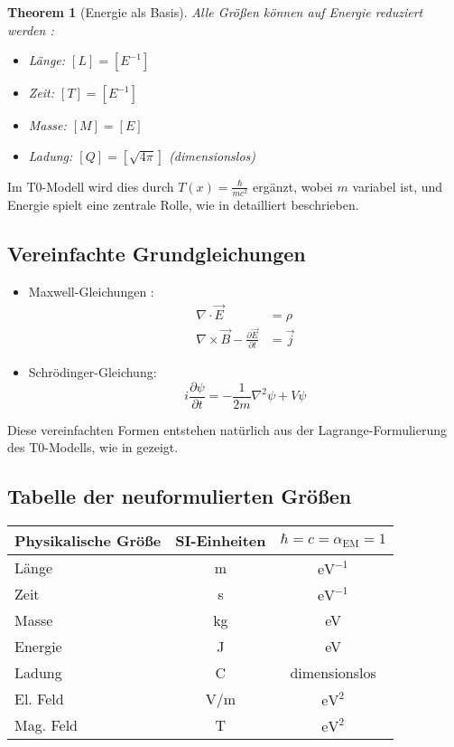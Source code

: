 \documentclass[12pt,a4paper]{article}
\newcommand{\Tfield}{T(x)}
\newcommand{\alphaEM}{\alpha_{\text{EM}}}
\newtheorem{theorem}{Theorem}[section]
\begin{document}
	\begin{theorem}[Energie als Basis]
		Alle Größen können auf Energie reduziert werden \cite{Duff2002}:
		\begin{itemize}
			\item Länge: \([L] = [E^{-1}]\)
			\item Zeit: \([T] = [E^{-1}]\)
			\item Masse: \([M] = [E]\)
			\item Ladung: \([Q] = [\sqrt{4\pi}]\) (dimensionslos)
		\end{itemize}
	\end{theorem}
	
	Im T0-Modell wird dies durch \(\Tfield = \frac{\hbar}{m c^2}\) ergänzt, wobei \(m\) variabel ist, und Energie spielt eine zentrale Rolle, wie in \cite{pascher_zeit_masse_2025} detailliert beschrieben.
	
	\subsection{Vereinfachte Grundgleichungen}
	\label{subsec:simplified_equations}
	
	\begin{itemize}
		\item Maxwell-Gleichungen \cite{Feynman1985}:
		\begin{align}
			\nabla \cdot \vec{E} &= \rho \\
			\nabla \times \vec{B} - \frac{\partial \vec{E}}{\partial t} &= \vec{j}
		\end{align}
		\item Schrödinger-Gleichung:
		\begin{equation}
			i \frac{\partial \psi}{\partial t} = -\frac{1}{2m} \nabla^2 \psi + V \psi
		\end{equation}
	\end{itemize}
	
	Diese vereinfachten Formen entstehen natürlich aus der Lagrange-Formulierung des T0-Modells, wie in \cite{pascher_lagrange_2025} gezeigt.
	
	\subsection{Tabelle der neuformulierten Größen}
	\label{subsec:reformulated_quantities}
	
	\begin{center}
		\begin{tabular}{|l|c|c|}
			\hline
			\textbf{Physikalische Größe} & \textbf{SI-Einheiten} & \textbf{\(\hbar = c = \alphaEM = 1\)} \\
			\hline
			Länge & m & \(\text{eV}^{-1}\) \\
			Zeit & s & \(\text{eV}^{-1}\) \\
			Masse & kg & eV \\
			Energie & J & eV \\
			Ladung & C & dimensionslos \\
			El. Feld & V/m & \(\text{eV}^2\) \\
			Mag. Feld & T & \(\text{eV}^2\) \\
			\hline
		\end{tabular}
	\end{center}
	
\end{document}
